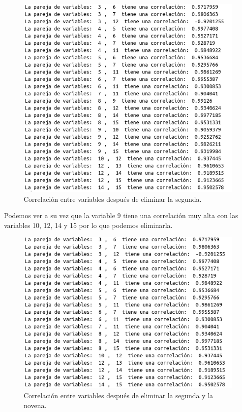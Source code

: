 \documentclass[12pt,a4paper]{article}
\begin{document}
\begin{figure}[H]
	\centering
	\includegraphics[scale=0.6]{./Imagenes/correlacion_entre_variables2.png}
	\caption{Correlación entre variables después de eliminar la segunda.}
\end{figure}

Podemos ver a su vez que la variable 9 tiene una correlación muy alta con las variables 10, 12, 14 y 15 por lo que podemos eliminarla.

\begin{figure}[H]
	\centering
	\includegraphics[scale=0.6]{./Imagenes/correlacion_entre_variables3.png}
	\caption{Correlación entre variables después de eliminar la segunda y la novena.}
\end{figure}
\end{document}
